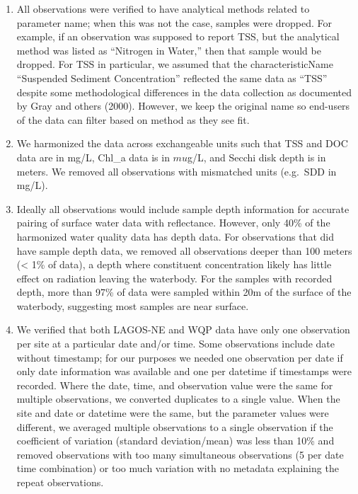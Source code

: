 \documentclass[]{agujournal2018}
\begin{document}
\begin{enumerate}
\def\labelenumi{\arabic{enumi}.}
\item
  All observations were verified to have analytical methods related to
  parameter name; when this was not the case, samples were dropped. For
  example, if an observation was supposed to report TSS, but the
  analytical method was listed as ``Nitrogen in Water,'' then that
  sample would be dropped. For TSS in particular, we assumed that the
  characteristicName ``Suspended Sediment Concentration'' reflected the
  same data as ``TSS'' despite some methodological differences in the
  data collection as documented by Gray and others (2000). However, we
  keep the original name so end-users of the data can filter based on
  method as they see fit.
\item
  We harmonized the data across exchangeable units such that TSS and DOC
  data are in mg/L, Chl\_a data is in \(mu\)g/L, and Secchi disk depth
  is in meters. We removed all observations with mismatched units
  (e.g.~SDD in mg/L).
\item
  Ideally all observations would include sample depth information for
  accurate pairing of surface water data with reflectance. However, only
  40\% of the harmonized water quality data has depth data. For
  observations that did have sample depth data, we removed all
  observations deeper than 100 meters (\textless{} 1\% of data), a depth
  where constituent concentration likely has little effect on radiation
  leaving the waterbody. For the samples with recorded depth, more than
  97\% of data were sampled within 20m of the surface of the waterbody,
  suggesting most samples are near surface.
\item
  We verified that both LAGOS-NE and WQP data have only one observation
  per site at a particular date and/or time. Some observations include
  date without timestamp; for our purposes we needed one observation per
  date if only date information was available and one per datetime if
  timestamps were recorded. Where the date, time, and observation value
  were the same for multiple observations, we converted duplicates to a
  single value. When the site and date or datetime were the same, but
  the parameter values were different, we averaged multiple observations
  to a single observation if the coefficient of variation (standard
  deviation/mean) was less than 10\% and removed observations with too
  many simultaneous observations (5 per date time combination) or too
  much variation with no metadata explaining the repeat observations.

\end{enumerate}
\end{document}
